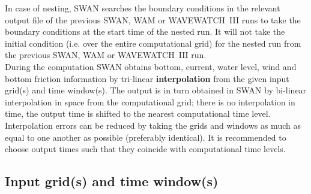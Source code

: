 \documentclass[12pt]{book}
\begin{document}
In case of nesting, SWAN searches the boundary conditions in the relevant output file of the previous
SWAN, WAM or WAVEWATCH~III runs to take the boundary conditions at the start time of the nested run.
It will not take the initial condition (i.e. over the entire computational grid) for the nested run
from the previous SWAN, WAM or WAVEWATCH~III run.
\\[2ex]
\noindent
During the computation SWAN obtains bottom, current, water level, wind and bottom friction information
by tri-linear {\bf interpolation} from the given input grid(s) and time window(s). The output is in turn
obtained in SWAN by bi-linear interpolation in space from the computational grid; there is no interpolation
in time, the output time is shifted to the nearest computational time level. Interpolation errors can be
reduced by taking the grids and windows as much as equal to one another as possible (preferably identical).
It is recommended to choose output times such that they coincide with computational time levels.

\subsection{Input grid(s) and time window(s)}
\label{sec:inpgrid}
\end{document}
